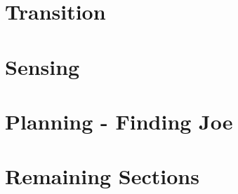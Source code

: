 \documentclass{article}
\begin{document}
\section{Transition}


\section{Sensing}


\section{Planning - Finding Joe}


\section{Remaining Sections}
\end{document}
